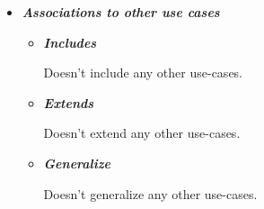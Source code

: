 \begin{itemize}
\begin{itemize}
\end{itemize}

\item {\bf \em Associations to other use cases}

\begin{itemize}

\item {\bf \em Includes}
\par \noindent
Doesn't include any other use-cases.

\item {\bf \em Extends}
\par \noindent
Doesn't extend any other use-cases.

\item {\bf \em Generalize}
\par \noindent
Doesn't generalize any other use-cases.
\end{itemize}

\end{itemize}

